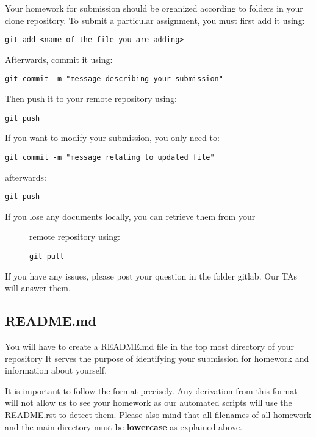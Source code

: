 Your homework for submission should be organized according to folders in
your clone repository. To submit a particular assignment, you must first
add it using:

\begin{verbatim}
git add <name of the file you are adding>
\end{verbatim}

Afterwards, commit it using:

\begin{verbatim}
git commit -m "message describing your submission"
\end{verbatim}

Then push it to your remote repository using:

\begin{verbatim}
git push
\end{verbatim}

If you want to modify your submission, you only need to:

\begin{verbatim}
git commit -m "message relating to updated file"
\end{verbatim}

afterwards:

\begin{verbatim}
git push
\end{verbatim}

\begin{description}
\item[If you lose any documents locally, you can retrieve them from
your]
remote repository using:

\begin{verbatim}
git pull
\end{verbatim}
\end{description}

If you have any issues, please post your question in the folder gitlab.
Our TAs will answer them.

\subsection{README.md}\label{readme.md}

You will have to create a README.md file in the top most directory of
your repository It serves the purpose of identifying your submission for
homework and information about yourself.

It is important to follow the format precisely. Any derivation from this
format will not allow us to see your homework as our automated scripts
will use the README.rst to detect them. Please also mind that all
filenames of all homework and the main directory must be
\textbf{lowercase} as explained above.

